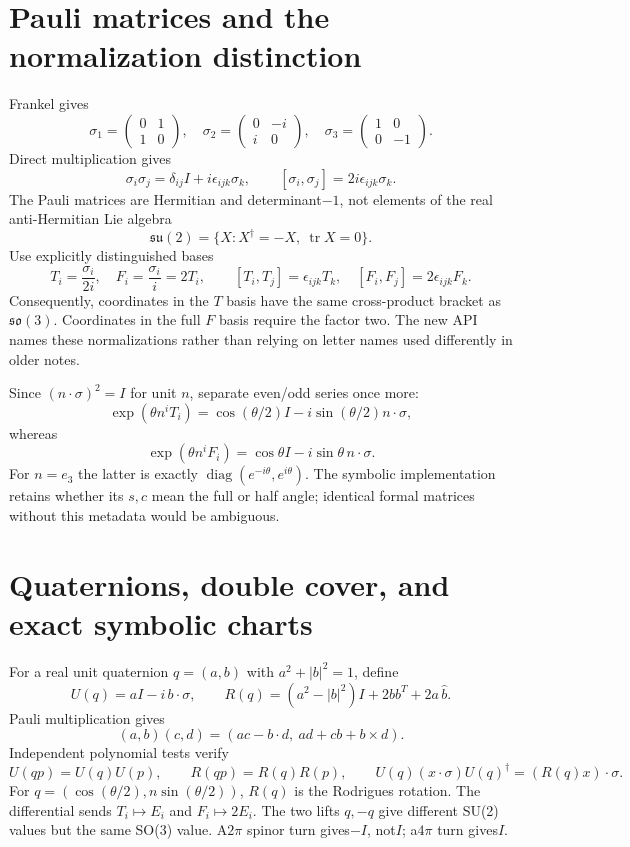 \documentclass{article}
\newcommand{\su}{\mathfrak{su}}
\newcommand{\so}{\mathfrak{so}}
\begin{document}
\section{Pauli matrices and the normalization distinction}
Frankel gives
\[
 \sigma_1=\begin{pmatrix}0&1\\1&0\end{pmatrix},\quad
 \sigma_2=\begin{pmatrix}0&-i\\i&0\end{pmatrix},\quad
 \sigma_3=\begin{pmatrix}1&0\\0&-1\end{pmatrix}.
\]
Direct multiplication gives
\[
 \sigma_i\sigma_j=\delta_{ij}I+i\epsilon_{ijk}\sigma_k,\qquad
 [\sigma_i,\sigma_j]=2i\epsilon_{ijk}\sigma_k .
\]
The Pauli matrices are Hermitian and determinant$-1$, not elements of the
real anti-Hermitian Lie algebra
\[
 \su(2)=\{X:X^\dagger=-X,\ \operatorname{tr}X=0\}.
\]
Use explicitly distinguished bases
\[
 T_i=\frac{\sigma_i}{2i},\quad F_i=\frac{\sigma_i}{i}=2T_i,\qquad
 [T_i,T_j]=\epsilon_{ijk}T_k,\quad
 [F_i,F_j]=2\epsilon_{ijk}F_k.
\]
Consequently, coordinates in the $T$ basis have the same cross-product
bracket as $\so(3)$. Coordinates in the full $F$ basis require the factor two.
The new API names these normalizations rather than relying on letter names
used differently in older notes.

Since $(n\cdot\sigma)^2=I$ for unit $n$, separate even/odd series once more:
\[
 \exp(\theta n^iT_i)
 =\cos(\theta/2)I-i\sin(\theta/2)n\cdot\sigma ,
\]
whereas
\[
 \exp(\theta n^iF_i)
 =\cos\theta I-i\sin\theta\,n\cdot\sigma .
\]
For $n=e_3$ the latter is exactly
$\operatorname{diag}(e^{-i\theta},e^{i\theta})$.
The symbolic implementation retains whether its $s,c$ mean the full or half
angle; identical formal matrices without this metadata would be ambiguous.

\section{Quaternions, double cover, and exact symbolic charts}
For a real unit quaternion $q=(a,b)$ with $a^2+|b|^2=1$, define
\[
 U(q)=aI-i\,b\cdot\sigma,\qquad
 R(q)=(a^2-|b|^2)I+2bb^T+2a\,\widehat b .
\]
Pauli multiplication gives
\[
 (a,b)(c,d)=(ac-b\cdot d,\ ad+cb+b\times d).
\]
Independent polynomial tests verify
\[
 U(qp)=U(q)U(p),\qquad R(qp)=R(q)R(p),\qquad
 U(q)(x\cdot\sigma)U(q)^\dagger=(R(q)x)\cdot\sigma .
\]
For $q=(\cos(\theta/2),n\sin(\theta/2))$, $R(q)$ is the Rodrigues rotation.
The differential sends $T_i\mapsto E_i$ and $F_i\mapsto2E_i$.
The two lifts $q,-q$ give different SU(2) values but the same SO(3) value.
A$2\pi$ spinor turn gives$-I$, not$I$; a$4\pi$ turn gives$I$.
\end{document}
